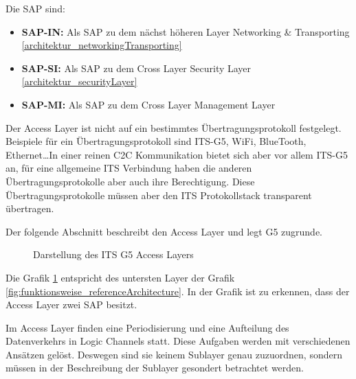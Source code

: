 Die \ac{SAP} sind:
\begin{itemize}
	\item \textbf{SAP-IN: } Als \ac{SAP} zu dem nächst höheren Layer  Networking \& Transporting \ref{architektur_networkingTransporting}
	\item \textbf{SAP-SI: } Als \ac{SAP} zu dem Cross Layer Security Layer \ref{architektur_securityLayer}
	\item \textbf{SAP-MI: } Als \ac{SAP} zu dem Cross Layer Management Layer \label{architektur_managementLayer}
\end{itemize}


Der Access Layer ist nicht auf ein bestimmtes Übertragungsprotokoll festgelegt. Beispiele für ein Übertragungsprotokoll sind ITS-G5, WiFi, BlueTooth, Ethernet\dots In einer reinen \ac{C2C} Kommunikation bietet sich aber vor allem ITS-G5 an, für eine allgemeine \ac{ITS} Verbindung haben die anderen Übertragungsprotokolle aber auch ihre Berechtigung. Diese Übertragungsprotokolle müssen aber den \ac{ITS} Protokollstack transparent übertragen. 

Der folgende Abschnitt beschreibt den Access Layer und legt G5 zugrunde.
 
\begin{figure}
	\caption{Darstellung des ITS G5 Access Layers \cite{etsi302663}}
	\label{fig:architektur_accessLayer}
\end{figure}

Die Grafik \ref{fig:architektur_accessLayer} entspricht des untersten Layer der Grafik \ref{fig:funktionsweise_referenceArchitecture}. In der Grafik ist zu erkennen, dass der Access Layer zwei \ac{SAP} besitzt.


Im Access Layer finden eine Periodisierung und eine Aufteilung des Datenverkehrs in Logic Channels statt. Diese Aufgaben werden mit verschiedenen Ansätzen gelöst. Deswegen sind sie keinem Sublayer genau zuzuordnen, sondern müssen in der Beschreibung der Sublayer gesondert betrachtet werden.


